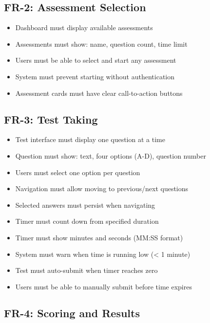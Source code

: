 \documentclass[12pt,a4paper]{report}
\begin{document}
\subsection{FR-2: Assessment Selection}

\begin{itemize}
    \item Dashboard must display available assessments
    \item Assessments must show: name, question count, time limit
    \item Users must be able to select and start any assessment
    \item System must prevent starting without authentication
    \item Assessment cards must have clear call-to-action buttons
\end{itemize}

\subsection{FR-3: Test Taking}

\begin{itemize}
    \item Test interface must display one question at a time
    \item Question must show: text, four options (A-D), question number
    \item Users must select one option per question
    \item Navigation must allow moving to previous/next questions
    \item Selected answers must persist when navigating
    \item Timer must count down from specified duration
    \item Timer must show minutes and seconds (MM:SS format)
    \item System must warn when time is running low (< 1 minute)
    \item Test must auto-submit when timer reaches zero
    \item Users must be able to manually submit before time expires
\end{itemize}

\subsection{FR-4: Scoring and Results}
\end{document}
